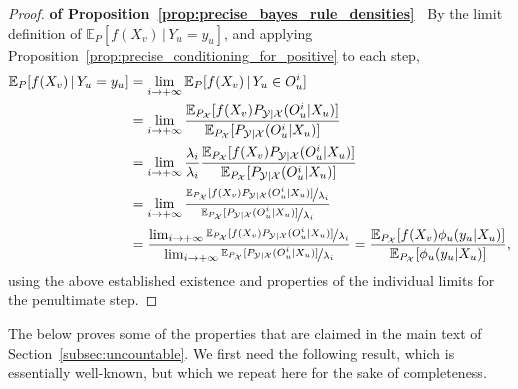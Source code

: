 \documentclass[twoside,11pt]{article}
\newcommand{\states}{\mathcal{X}}
\newcommand{\observs}{\mathcal{Y}}
\begin{document}
\begin{proof}{\bf of Proposition~\ref{prop:precise_bayes_rule_densities}~}
By the limit definition of $\mathbb{E}_P[f(X_v)\,\vert\,Y_u=y_u]$, and applying Proposition~\ref{prop:precise_conditioning_for_positive} to each step,
\begin{align*}
\mathbb{E}_P[f(X_v)\,\vert\,Y_u=y_u] &= \lim_{i\to+\infty} \mathbb{E}_P[f(X_v)\,\vert\,Y_u\in O_u^i] \\
 &= \lim_{i\to+\infty} \frac{\mathbb{E}_{P_\states}[f(X_v)P_{\observs\vert\states}(O_u^i\vert X_u)]}{\mathbb{E}_{P_\states}[P_{\observs\vert\states}(O_u^i\vert X_u)]} \\
 &= \lim_{i\to+\infty} \frac{\lambda_i}{\lambda_i}\frac{\mathbb{E}_{P_\states}[f(X_v)P_{\observs\vert\states}(O_u^i\vert X_u)]}{\mathbb{E}_{P_\states}[P_{\observs\vert\states}(O_u^i\vert X_u)]} \\
 &= \lim_{i\to+\infty} \frac{\nicefrac{\mathbb{E}_{P_\states}[f(X_v)P_{\observs\vert\states}(O_u^i\vert X_u)]}{\lambda_i}}{\nicefrac{\mathbb{E}_{P_\states}[P_{\observs\vert\states}(O_u^i\vert X_u)]}{\lambda_i}} \\
 &= \frac{\lim_{i\to+\infty} \nicefrac{\mathbb{E}_{P_\states}[f(X_v)P_{\observs\vert\states}(O_u^i\vert X_u)]}{\lambda_i}}{\lim_{i\to+\infty} \nicefrac{\mathbb{E}_{P_\states}[P_{\observs\vert\states}(O_u^i\vert X_u)]}{\lambda_i}}= \frac{\mathbb{E}_{P_\states}[f(X_v)\phi_u(y_u\vert X_u)]}{\mathbb{E}_{P_\states}[\phi_u(y_u\vert X_u)]},
\end{align*}
using the above established existence and properties of the individual limits for the penultimate step.

\end{proof}




The below proves some of the properties that are claimed in the main text of Section~\ref{subsec:uncountable}. We first need the following result, which is essentially well-known, but which we repeat here for the sake of completeness.
\end{document}
